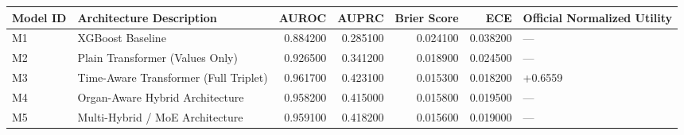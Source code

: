 \begin{tabular}{llrrrrl}
\toprule
Model ID & Architecture Description & AUROC & AUPRC & Brier Score & ECE & Official Normalized Utility \\
\midrule
M1 & XGBoost Baseline & 0.884200 & 0.285100 & 0.024100 & 0.038200 & — \\
M2 & Plain Transformer (Values Only) & 0.926500 & 0.341200 & 0.018900 & 0.024500 & — \\
M3 & Time-Aware Transformer (Full Triplet) & 0.961700 & 0.423100 & 0.015300 & 0.018200 & +0.6559 \\
M4 & Organ-Aware Hybrid Architecture & 0.958200 & 0.415000 & 0.015800 & 0.019500 & — \\
M5 & Multi-Hybrid / MoE Architecture & 0.959100 & 0.418200 & 0.015600 & 0.019000 & — \\
\bottomrule
\end{tabular}
